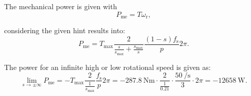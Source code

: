 \begin{solutionblock}
    The mechanical power is given with
    $$ P_{\mathrm{me}} = T \omega_{\mathrm{r}}, $$

    considering the given hint results into:
    $$ P_{\mathrm{me}} = T_{\mathrm{max}} \frac{2}{\frac{s}{s_{\mathrm{max}}}+ \frac{s_{\mathrm{max}}}{s}} \frac{(1-s)f_{\mathrm{s}}}{p} 2\pi. $$

    The power for an infinite high or low rotational speed is given as:
    $$ \lim_{s \to \pm \infty} P_{\mathrm{me}} = -T_{\mathrm{max}} \frac{2}{\frac{1}{s_{\mathrm{max}}}} \frac{f_{\mathrm{s}}}{p}2\pi = -\SI{287.8}{\newton\metre} \cdot \frac{2}{\frac{1}{0.21}} \cdot \frac{\SI{50}{\per\second}}{3}\cdot 2\pi = \SI{-12658}{\watt}. $$ 
    
\end{solutionblock}






